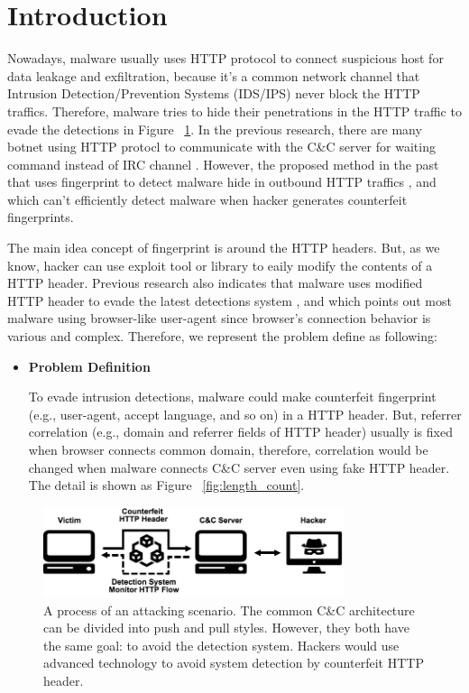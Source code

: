 \section{Introduction}

Nowadays, malware usually uses HTTP protocol to connect suspicious host for data leakage and exfiltration, because it's a common network channel that Intrusion Detection/Prevention Systems (IDS/IPS) never block the HTTP traffics. Therefore, malware tries to hide their penetrations in the HTTP traffic to evade the detections in Figure ~\ref{fig:attack}. In the previous research, there are many botnet using HTTP protocl to communicate with the C\&C server for waiting command instead of IRC channel \cite{gu2008botsniffer}. However, the proposed method in the past that uses fingerprint to detect malware hide in outbound HTTP traffics \cite{bortolameotti2017decanter}, and which can't efficiently detect malware when hacker generates counterfeit fingerprints.  

The main idea concept of fingerprint is around the HTTP headers. But, as we know, hacker can use exploit tool or library to eaily modify the contents of a HTTP header. Previous research also indicates that malware uses modified HTTP header to evade the latest detections system \cite{grill2014malware}, and which points out most malware using browser-like user-agent since browser's connection behavior is various and complex. Therefore, we represent the problem define as following:

\begin{itemize}

\item {\bf Problem Definition}

To evade intrusion detections, malware could make counterfeit fingerprint (e.g., user-agent, accept language, and so on) in a HTTP header. But, referrer correlation (e.g., domain and referrer fields of HTTP header) usually is fixed when browser connects common domain, therefore, correlation would be changed when malware connects C\&C server even using fake HTTP header. The detail is shown as Figure ~\ref{fig:length_count}.

\end{itemize}

\begin{figure}[!t]
\centering
\includegraphics[width=250pt]{image/attack.png}
\caption{A process of an attacking scenario. The common C\&C architecture can be divided into push and pull styles. However, they both have the same goal: to avoid the detection system. Hackers would use advanced technology to avoid system detection by counterfeit HTTP header.}
\label{fig:attack}
\end{figure}

